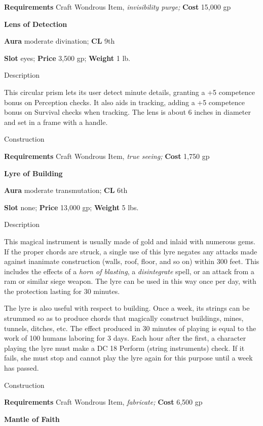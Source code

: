 \textbf{Requirements} Craft Wondrous Item,\textit{ invisibility purge;}\textbf{ Cost }15,000 gp
				
\textbf{Lens of Detection}
				
\textbf{Aura} moderate divination;\textbf{ CL }9th
				
\textbf{Slot} eyes; \textbf{Price} 3,500 gp; \textbf{Weight} 1 lb.
				
Description
				
This circular prism lets its user detect minute details, granting a +5 competence bonus on Perception checks. It also aids in tracking, adding a +5 competence bonus on Survival checks when tracking. The lens is about 6 inches in diameter and set in a frame with a handle. 
				
Construction
				
\textbf{Requirements} Craft Wondrous Item,\textit{ true seeing;}\textbf{ Cost }1,750 gp
				
\textbf{Lyre of Building}
				
\textbf{Aura} moderate transmutation;\textbf{ CL }6th
				
\textbf{Slot} none; \textbf{Price} 13,000 gp; \textbf{Weight} 5 lbs.
				
Description
				
This magical instrument is usually made of gold and inlaid with numerous gems. If the proper chords are struck, a single use of this lyre negates any attacks made against inanimate construction (walls, roof, floor, and so on) within 300 feet. This includes the effects of a \textit{horn of blasting}, a \textit{disintegrate} spell, or an attack from a ram or similar siege weapon. The lyre can be used in this way once per day, with the protection lasting for 30 minutes.
				
The lyre is also useful with respect to building. Once a week, its strings can be strummed so as to produce chords that magically construct buildings, mines, tunnels, ditches, etc. The effect produced in 30 minutes of playing is equal to the work of 100 humans laboring for 3 days. Each hour after the first, a character playing the lyre must make a DC 18 Perform (string instruments) check. If it fails, she must stop and cannot play the lyre again for this purpose until a week has passed. 
				
Construction
				
\textbf{Requirements} Craft Wondrous Item,\textit{ fabricate;}\textbf{ Cost }6,500 gp
				
\textbf{Mantle of Faith}
				
